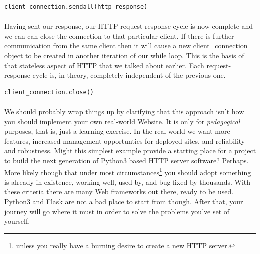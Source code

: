\begin{lstlisting}[style=CODE]
client_connection.sendall(http_response)
\end{lstlisting}

\paragraph{} Having sent our response, our HTTP request-response cycle is now complete and we can can close the connection to that particular client. If there is further communication from the same client then it will cause a new client\_connection object to be created in another iteration of our while loop. This is the basis of that stateless aspect of HTTP that we talked about earlier. Each request-response cycle is, in theory, completely independent of the previous one.

\begin{lstlisting}[style=CODE]
client_connection.close()
\end{lstlisting}



\paragraph{} We should probably wrap things up by clarifying that this approach isn't how you should implement your own real-world Website. It is only for \emph{pedagogical} purposes, that is, just a learning exercise. In the real world we want more features, increased management opportunties for deployed sites, and reliability and robustness. Might this simplest example provide a starting place for a project to build the next generation of Python3 based HTTP server software? Perhaps. More likely though that under most circumstances\footnote{unless you really have a burning desire to create a new HTTP server.} you should adopt something is already in existence, working well, used by, and bug-fixed by thousands. With these criteria there are many Web frameworks out there, ready to be used. Python3 and Flask are not a bad place to start from though. After that, your journey will go where it must in order to solve the problems you've set of yourself.
